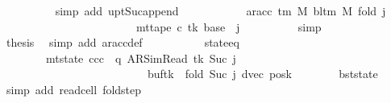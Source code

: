 \begin{isabellebody}
\ \ \ \ \ \ \ \ \isamarkupfalse%
\ {\isacharparenleft}{\kern0pt}simp\ add{\isacharcolon}{\kern0pt}\ upt{\isacharunderscore}{\kern0pt}Suc{\isacharunderscore}{\kern0pt}append{\isacharparenright}{\kern0pt}\isanewline
\ \ \ \ \ \ \isamarkupfalse%
\ \isamarkupfalse%
\ {\isachardoublequoteopen}{\isasymdots}\ {\isacharequal}{\kern0pt}\ ar{\isacharunderscore}{\kern0pt}acc\ {\isacharparenleft}{\kern0pt}{\isasymGamma}{\isacharunderscore}{\kern0pt}tm\ M{\isacharparenright}{\kern0pt}\ {\isacharparenleft}{\kern0pt}bl{\isacharunderscore}{\kern0pt}tm\ M{\isacharparenright}{\kern0pt}\ {\isacharparenleft}{\kern0pt}{\isacharquery}{\kern0pt}fold\ j{\isacharparenright}{\kern0pt}\isanewline
\ \ \ \ \ \ \ \ \ \ \ \ \ \ \ \ \ \ \ \ \ \ \ \ {\isacharparenleft}{\kern0pt}mt{\isacharunderscore}{\kern0pt}tape\ c{\isacharprime}{\kern0pt}\ tk\ {\isacharparenleft}{\kern0pt}base\ {\isacharplus}{\kern0pt}\ j{\isacharparenright}{\kern0pt}{\isacharparenright}{\kern0pt}{\isachardoublequoteclose}\isanewline
\ \ \ \ \ \ \ \ \isamarkupfalse%
\ simp\isanewline
\ \ \ \ \ \ \isamarkupfalse%
\ \isamarkupfalse%
\ {\isacharquery}{\kern0pt}thesis\ \isamarkupfalse%
\ {\isacharparenleft}{\kern0pt}simp\ add{\isacharcolon}{\kern0pt}\ ar{\isacharunderscore}{\kern0pt}acc{\isacharunderscore}{\kern0pt}def{\isacharparenright}{\kern0pt}\isanewline
\ \ \ \ \isamarkupfalse%
\isanewline
\ \ \ \ \isamarkupfalse%
\ state{\isacharunderscore}{\kern0pt}eq{\isacharcolon}{\kern0pt}\isanewline
\ \ \ \ \ \ \ \ {\isachardoublequoteopen}mt{\isacharunderscore}{\kern0pt}state\ ccc\ {\isacharequal}{\kern0pt}\ {\isacharparenleft}{\kern0pt}q{\isacharcomma}{\kern0pt}\ AR{\isacharunderscore}{\kern0pt}SimRead{\isacharcomma}{\kern0pt}\ tk{\isacharcomma}{\kern0pt}\ Suc\ j\ {\isacharplus}{\kern0pt}\ {}{\isacharcomma}{\kern0pt}\isanewline
\ \ \ \ \ \ \ \ \ \ \ \ \ \ \ \ \ \ \ \ \ \ \ \ \ \ buf{}{\isacharparenleft}{\kern0pt}tk\ {\isacharcolon}{\kern0pt}{\isacharequal}{\kern0pt}\ {\isacharquery}{\kern0pt}fold\ {\isacharparenleft}{\kern0pt}Suc\ j{\isacharparenright}{\kern0pt}{\isacharparenright}{\kern0pt}{\isacharcomma}{\kern0pt}\ dvec{\isacharcomma}{\kern0pt}\ posk{\isacharparenright}{\kern0pt}{\isachardoublequoteclose}\isanewline
\ \ \ \ \ \ \isamarkupfalse%
\ bst{\isacharunderscore}{\kern0pt}state\ \isamarkupfalse%
\ {\isacharparenleft}{\kern0pt}simp\ add{\isacharcolon}{\kern0pt}\ read{\isacharunderscore}{\kern0pt}cell\ fold{\isacharunderscore}{\kern0pt}step{\isacharparenright}{\kern0pt}\isanewline

\end{isabellebody}
